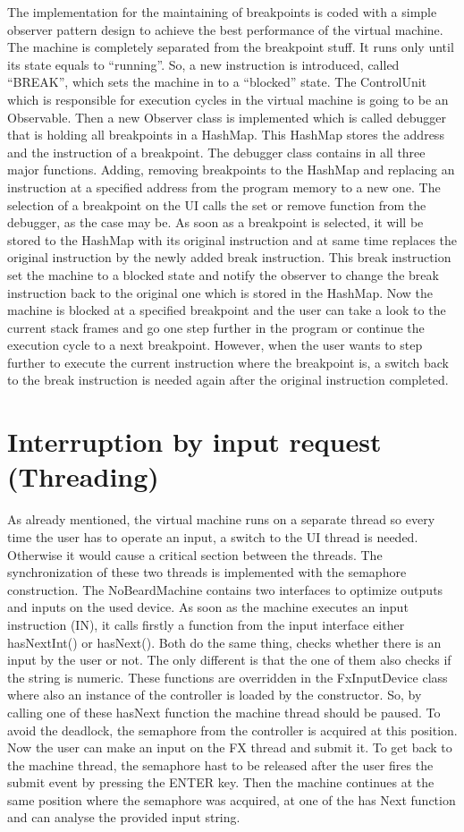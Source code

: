 The implementation for the maintaining of breakpoints is coded with a simple observer pattern design to achieve the best performance of the virtual machine. The machine is completely separated from the breakpoint stuff. It runs only until its state equals to “running”. So, a new instruction is introduced, called “BREAK”, which sets the machine in to a “blocked” state. The ControlUnit which is responsible for execution cycles in the virtual machine is going to be an Observable. Then a new Observer class is implemented which is called debugger that is holding all breakpoints in a HashMap. This HashMap stores the address and the instruction of a breakpoint. The debugger class contains in all three major functions. Adding, removing breakpoints to the HashMap and replacing an instruction at a specified address from the program memory to a new one. The selection of a breakpoint on the UI calls the set or remove function from the debugger, as the case may be. As soon as a breakpoint is selected, it will be stored to the HashMap with its original instruction and at same time replaces the original instruction by the newly added break instruction. This break instruction set the machine to a blocked state and notify the observer to change the break instruction back to the original one which is stored in the HashMap. Now the machine is blocked at a specified breakpoint and the user can take a look to the current stack frames and go one step further in the program or continue the execution cycle to a next breakpoint. However, when the user wants to step further to execute the current instruction where the breakpoint is, a switch back to the break instruction is needed again after the original instruction completed.  
\section{Interruption by input request (Threading)}
As already mentioned, the virtual machine runs on a separate thread so every time the user has to operate an input, a switch to the UI thread is needed. Otherwise it would cause a critical section between the threads. The synchronization of these two threads is implemented with the semaphore construction. The NoBeardMachine contains two interfaces to optimize outputs and inputs on the used device. As soon as the machine executes an input instruction (IN), it calls firstly a function from the input interface either hasNextInt() or hasNext(). Both do the same thing, checks whether there is an input by the user or not. The only different is that the one of them also checks if the string is numeric. These functions are overridden in the FxInputDevice class where also an instance of the controller is loaded by the constructor. So, by calling one of these hasNext function the machine thread should be paused. To avoid the deadlock, the semaphore from the controller is acquired at this position. Now the user can make an input on the FX thread and submit it. To get back to the machine thread, the semaphore hast to be released after the user fires the submit event by pressing the ENTER key. Then the machine continues at the same position where the semaphore was acquired, at one of the has Next function and can analyse the provided input string.
